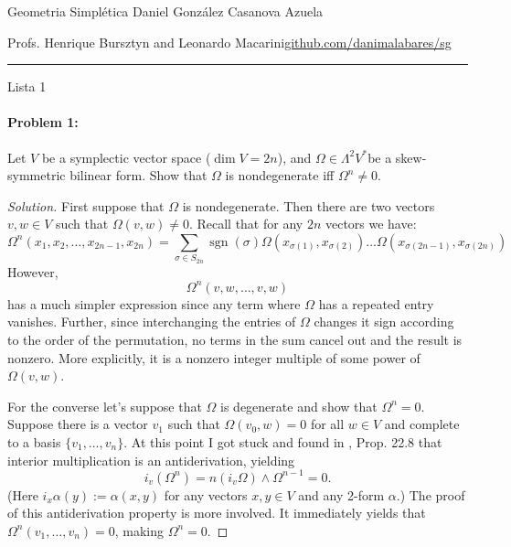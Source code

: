 


\usepackage[style=authortitle-terse,backend=bibtex]{biblatex}




\begin{minipage}{\textwidth}
	\begin{minipage}{1\textwidth}
		Geometria Simpl\'etica \hfill Daniel González Casanova Azuela
		
		{\small Profs. Henrique Bursztyn and Leonardo Macarini\hfill\href{https://github.com/danimalabares/sg}{github.com/danimalabares/sg}}
	\end{minipage}
\end{minipage}\vspace{.2cm}\hrule

\vspace{10pt}
{\huge Lista 1}


\paragraph{Problem 1:} Let $V$ be a symplectic vector space ($\dim V=2n$), and $\Omega\in \Lambda^{2} V^{*}$be a skew-symmetric bilinear form. Show that $\Omega$ is nondegenerate iff $\Omega^{n} \neq 0$.

\begin{proof}[Solution]
	First suppose that $\Omega$ is nondegenerate. Then there are two vectors  $v,w\in V$ such that $\Omega(v,w)\neq 0$. Recall that for any $2n$ vectors we have:
	\[\Omega^n(x_1,x_2,\ldots,x_{2n-1},x_{2n})=\sum_{\sigma\in S_{2n}}\operatorname{sgn}(\sigma)\Omega(x_{\sigma(1)},x_{\sigma(2)})\ldots\Omega(x_{\sigma(2n-1)},x_{\sigma(2n)})\]
However,
	\[\Omega^n(v,w,\ldots,v,w)\]
has a much simpler expression since any term where $\Omega$ has a repeated entry vanishes. Further, since interchanging the entries of $\Omega$ changes it sign according to the order of the permutation, no terms in the sum cancel out and the result is nonzero. More explicitly, it is a nonzero integer multiple of some power of $\Omega(v,w)$.

	For the converse let's suppose that $\Omega$ is degenerate and show that $\Omega^{n}=0$. Suppose there is a vector $v_1$ such that $\Omega( v_0,w)=0$ for all $w\in V$ and complete to a basis $\{v_1,\ldots,v_n\}$. At this point I got stuck and found in \cite{lee}, Prop. 22.8 that interior multiplication is an antiderivation, yielding
	\[i_v(\Omega^n)=n(i_v\Omega)\wedge \Omega^{n-1}=0.\]
	(Here $i_x\alpha(y):=\alpha(x,y)$ for any vectors $x,y\in V$ and any 2-form $\alpha$.) The proof of this antiderivation property is more involved. It immediately yields that $\Omega^n(v_1,\ldots,v_n)=0$, making $\Omega^n=0$.

\end{proof}

